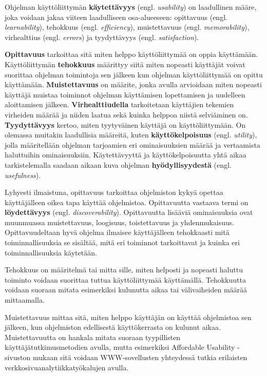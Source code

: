 \documentclass[utf8]{gradu3}
\begin{document}
\label{general-usability-requirements}
Ohjelman käyttöliittymän \textbf{käytettävyys} (engl. \textit{usability}) on laadullinen määre, joka voidaan jakaa viiteen laadulliseen osa-alueeseen: opittavuus (engl. \textit{learnability}), tehokkuus (engl. \textit{efficiency}), muistettavuus (engl. \textit{memorability}), virhealttius (engl. \textit{errors}) ja tyydyttävyys (engl. \textit{satisfaction}). 

\textbf{Opittavuus} tarkoittaa sitä miten helppo käyttöliittymää on oppia käyttämään. Käyttöliittymän \textbf{tehokkuus} määrittyy siitä miten nopeasti käyttäjät voivat suorittaa ohjelman toimintoja sen jälkeen kun ohjelman käyttöliittymää on opittu käyttämään. \textbf{Muistettavuus} on määrite, jonka avulla arvioidaan miten nopeasti käyttäjä muistaa toiminnot ohjelman käyttämisen lopettamisen ja uudelleen aloittamisen jälkeen. \textbf{Virhealttiudella} tarkoitetaan käyttäjien tekemien virheiden määrää ja niiden laatua sekä kuinka helppoa niistä selviäminen on. \textbf{Tyydyttävyys} kertoo, miten tyytyväinen käyttäjä on käyttöliittymään. On olemassa muitakin laadullisia määreitä, kuten \textbf{käyttökelpoisuus} (engl. \textit{utility}), jolla määritellään ohjelman tarjoamien eri ominaisuuksien määrää ja vertaamista haluttuihin ominaisuuksiin. Käytettävyyttä ja käyttökelpoisuutta yhtä aikaa tarkistelemalla saadaan aikaan kuva ohjelman \textbf{hyödyllisyydestä} (engl. \textit{ usefulness}). \parencite[]{usability-101}

Lyhyesti ilmaistuna, opittavuus tarkoittaa ohjelmiston kykyä opettaa käyttäjälleen oikea tapa käyttää ohjelmistoa. Opittavuutta vastaava termi on \textbf{löydettävyys} (engl. \textit{discoverability}). Opittavuutta lisääviä ominaisuuksia ovat muunmuassa muistettavuus, loogisuus, toistettavuus ja yhdenmukaisuus. Opittavuudeltaan hyvä ohjelma ilmaisee käyttäjälleen tehokkaasti mitä toiminnallisuuksia se sisältää, mitä eri toiminnot tarkoittavat ja kuinka eri toiminnallisuuksia käytetään. \parencite[]{improving-learnability}

Tehokkuus on määritelmä tai mitta sille, miten helposti ja nopeasti haluttu toiminto voidaan suorittaa tuttua käyttöliittymää käyttämällä. Tehokkuutta voidaan suoraan mitata esimerkiksi kulunutta aikaa tai välivaiheiden määrää mittaamalla. 

Muistettavuus mittaa sitä, miten helppo käyttäjän on käyttää ohjelmistoa sen jälkeen, kun ohjelmiston edellisestä käyttökerrasta on kulunut aikaa. Muistettavuutta on hankala mitata suoraan tyypillisten käyttäjätutkimusmetodien avulla, mutta esimerkiksi Affordable Usability -sivuston \parencite[]{affordable-usability} mukaan sitä voidaan WWW-sovellusten yhteydessä tutkia erilaisten verkkosivuanalytiikkatyökalujen avulla.
\end{document}
